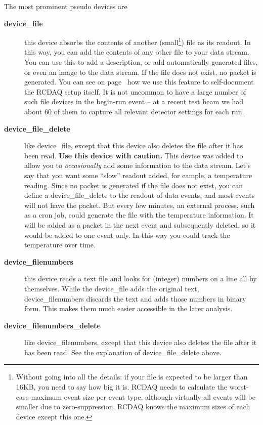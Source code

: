 \documentclass{article}[11pt]
\begin{document}
The most prominent pseudo devices are 
\begin{description}

\item[\bf device\_file] this device absorbs the contents of another
  (small\footnote{Without going into all the details: if your file is
  expected to be larger than 16KB, you need to say how big it
  is. RCDAQ needs to calculate the worst-case maximum event size per
  event type, although virtually all events will be smaller due to
  zero-suppression. RCDAQ knows the maximum sizes of each device
  except this one.}) file as its readout. In this way, you can add the
  contents of any other file to your data stream. You can use this to
  add a description, or add automatically generated files, or even an
  image to the data stream. If the file does not exist, no packet is
  generated. You can see on page~\pageref{packet900} how we use this
  feature to self-document the RCDAQ setup itself. It is not uncommon
  to have a large number of such file devices in the begin-run event
  -- at a recent test beam we had about 60 of them to capture all
  relevant detector settings for each run.

\item[\bf device\_file\_delete] \label{delete}like device\_file,
  except that this device also deletes the file after it has been
  read. {\bf Use this device with caution.} This device was added to
  allow you to \emph{occasionally} add some information to the data
  stream. Let's say that you want some ``slow'' readout added, for
  eample, a temperature reading.  Since no packet is generated if the
  file does not exist, you can define a device\_file\_delete to the
  readout of data events, and most events will not have the
  packet. But every few minutes, an external process, such as a cron
  job, could generate the file with the temperature information. It
  will be added as a packet in the next event and subsequently
  deleted, so it would be added to one event only. In this way you
  could track the temperature over time.


\item[\bf device\_filenumbers] this device reads a text file and looks for
  (integer) numbers on a line all by themselves. While the
  device\_file adds the original text, device\_filenumbers discards
  the text and adds those numbers in binary form.  This makes them
  much easier accessible in the later analysis.

\item[\bf device\_filenumbers\_delete] like device\_filenumbers, except
  that this device also deletes the file after it has been read. See
  the explanation of device\_file\_delete above. 


\end{description}
\end{document}
